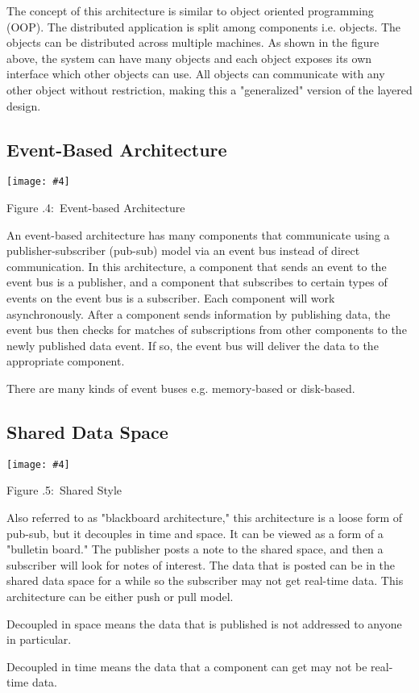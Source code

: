 \documentclass[twoside]{article}
\newcounter{lecnum}
\newcommand{\fig}[4]{
            \centerline{\texttt{[image: \#4]}}
            \begin{center}
            Figure \thelecnum.#1:~#3
            \end{center}
    }
\begin{document}
The concept of this architecture is similar to object oriented programming (OOP). The distributed application is split among components i.e. objects. The objects can be distributed across multiple machines. As shown in the figure above, the system can have many objects and each object exposes its own interface which other objects can use. All objects can communicate with any other object without restriction, making this a "generalized" version of the layered design.


\subsection{Event-Based Architecture}
\fig{4}{0.4}{Event-based Architecture}{event.png}

An event-based architecture has many components that communicate using a publisher-subscriber (pub-sub) model via an event bus instead of direct communication. In this architecture, a component that sends an event to the event bus is a publisher, and a component that subscribes to certain types of events on the event bus is a subscriber. Each component will work asynchronously. After a component sends information by publishing data, the event bus then checks for matches of subscriptions from other components to the newly published data event. If so, the event bus will deliver the data to the appropriate component.

There are many kinds of event buses e.g. memory-based or disk-based. 


\subsection{Shared Data Space}
\fig{5}{0.3}{Shared Style}{shared.png}

Also referred to as "blackboard architecture," this architecture is a loose form of pub-sub, but it decouples in time and space.  It can be viewed as a form of a "bulletin board."  The publisher posts a note to the shared space, and then a subscriber will look for notes of interest. The data that is posted can be in the shared data space for a while so the subscriber may not get real-time data. This architecture can be either push or pull model.

Decoupled in space means the data that is published is not addressed to anyone in particular.

Decoupled in time means the data that a component can get may not be real-time data.
\end{document}
